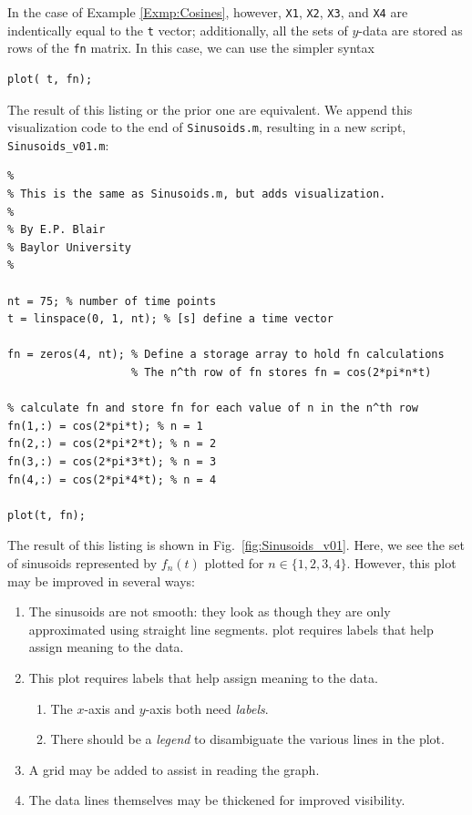In the case of Example \ref{Exmp:Cosines}, however, \texttt{X1}, \texttt{X2}, \texttt{X3}, and \texttt{X4} are indentically equal to the \texttt{t} vector; additionally, all the sets of $y$-data are stored as rows of the \texttt{fn} matrix. In this case, we can use the simpler syntax
\begin{lstlisting}[style=Matlab-editor]
plot( t, fn);
\end{lstlisting}
The result of this listing or the prior one are equivalent. We append this visualization code to the end of \texttt{Sinusoids.m}, resulting in a new script, \verb!Sinusoids_v01.m!:
\begin{lstlisting}[style=Matlab-editor]
% Sinusoids_v01.m
% 
% This is the same as Sinusoids.m, but adds visualization.
%
% By E.P. Blair
% Baylor University
%

nt = 75; % number of time points
t = linspace(0, 1, nt); % [s] define a time vector

fn = zeros(4, nt); % Define a storage array to hold fn calculations
                   % The n^th row of fn stores fn = cos(2*pi*n*t)
      
% calculate fn and store fn for each value of n in the n^th row
fn(1,:) = cos(2*pi*t); % n = 1
fn(2,:) = cos(2*pi*2*t); % n = 2
fn(3,:) = cos(2*pi*3*t); % n = 3
fn(4,:) = cos(2*pi*4*t); % n = 4

plot(t, fn);
\end{lstlisting}
The result of this listing is shown in Fig.\ \ref{fig:Sinusoids_v01}. Here, we see the set of sinusoids represented by $f_n (t)$ plotted for $n \in \{1, 2, 3, 4\}$. However, this plot may be improved in several ways:
\begin{enumerate}
\item The sinusoids are not smooth: they look as though they are only approximated using straight line segments. plot requires labels that help assign meaning to the data.
\item This plot requires labels that help assign meaning to the data.
\begin{enumerate}
\item The $x$-axis and $y$-axis both need \textit{labels}.
\item There should be a \textit{legend} to disambiguate the various lines in the plot.
\end{enumerate}

\item A grid may be added to assist in reading the graph.
\item The data lines themselves may be thickened for improved visibility.
\end{enumerate}

